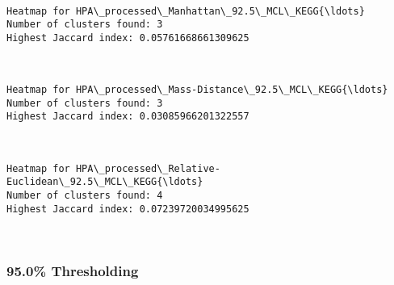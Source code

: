 \documentclass[11pt]{article}
\begin{document}
    \begin{center}
    \end{center}
    { \hspace*{\fill} \\}
    
    \begin{Verbatim}[commandchars=\\\{\}]
Heatmap for HPA\_processed\_Manhattan\_92.5\_MCL\_KEGG{\ldots}
Number of clusters found: 3
Highest Jaccard index: 0.05761668661309625

    \end{Verbatim}

    \begin{center}
    \end{center}
    { \hspace*{\fill} \\}
    
    \begin{Verbatim}[commandchars=\\\{\}]
Heatmap for HPA\_processed\_Mass-Distance\_92.5\_MCL\_KEGG{\ldots}
Number of clusters found: 3
Highest Jaccard index: 0.03085966201322557

    \end{Verbatim}

    \begin{center}
    \end{center}
    { \hspace*{\fill} \\}
    
    \begin{Verbatim}[commandchars=\\\{\}]
Heatmap for HPA\_processed\_Relative-Euclidean\_92.5\_MCL\_KEGG{\ldots}
Number of clusters found: 4
Highest Jaccard index: 0.07239720034995625

    \end{Verbatim}

    \begin{center}
    \end{center}
    { \hspace*{\fill} \\}
    
    \hypertarget{thresholding}{%
\subsubsection{95.0\% Thresholding}\label{thresholding}}
\end{document}
